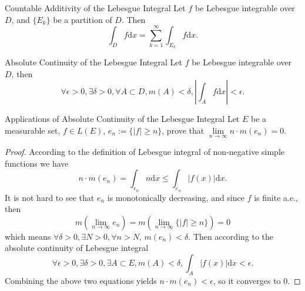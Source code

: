\begin{theorem}{Countable Additivity of the Lebesgue Integral}{}
  Let $f$ be Lebesgue integrable over $D$,
  and $\{E_k\}$ be a partition of $D$. Then
  \begin{equation}
    \int_D f \mathrm{d} x = \sum\limits_{k = 1}^{\infty} \int_{E_k} f \mathrm{d} x.
  \end{equation}
\end{theorem}


\begin{theorem}{Absolute Continuity of the Lebesgue Integral}{}
  Let $f$ be Lebesgue integrable over $D$,
  then
  \begin{equation}
    \forall \epsilon > 0, \exists \delta > 0, \forall A \subset D,
    m(A) < \delta, \left| \int_A f \mathrm{d} x \right| < \epsilon.
  \end{equation}
\end{theorem}

\begin{example}{Applications of Absolute Continuity of the Lebesgue Integral}{}
  Let $E$ be a measurable set, $f \in L(E)$, $e_n := \{|f| \geq n\}$,
  prove that $\lim \limits _{n \rightarrow \infty} n \cdot m(e_n) = 0$.
\end{example}

\begin{proof}
  According to the definition of Lebesgue integral of non-negative simple
  functions we have
  \begin{equation}
    n \cdot m(e_n) = \int_{e_n} n \mathrm{d} x \leq \int_{e_n} |f(x)|\mathrm{d} x.
  \end{equation}
  It is not hard to see that $e_n$ is monotonically decreasing,
  and since $f$ is finite a.e., then
  \begin{equation}
    m(\lim \limits _{n \rightarrow \infty} e_n)
    = m(\lim \limits _{n \rightarrow \infty} \{|f| \geq n\}) = 0
  \end{equation}
  which means $\forall \delta > 0, \exists N > 0, \forall n > N$, $m(e_n) < \delta$.
  Then according to the absolute continuity of Lebesgue integral
  \begin{equation}
    \forall \epsilon > 0, \exists \delta > 0, \exists A \subset E, m(A) < \delta,
    \int_A |f(x)|\mathrm{d} x < \epsilon.
  \end{equation}
  Combining the above two equations yields $n\cdot m(e_n) < \epsilon$,
  so it converges to $0$.
\end{proof}

